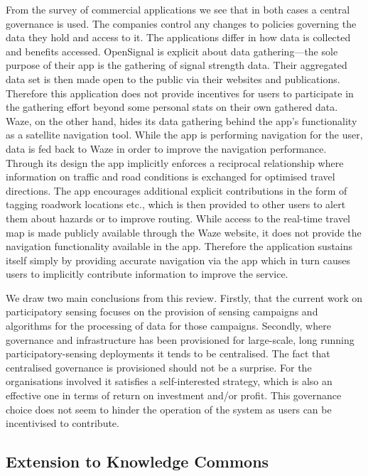 From the survey of commercial applications we see that 
in both cases a central governance is used. The companies control any changes to policies governing the data they hold and access to it. The applications differ in how data is collected and benefits accessed. 
OpenSignal is explicit about data gathering---the sole purpose of their app is the gathering of signal strength data. 
Their aggregated data set is then made open to the public via their websites and publications. Therefore this application does not provide incentives for users to participate in the gathering effort beyond some personal stats on their own gathered data. Waze, on the other hand, hides its data gathering behind the app's functionality as a satellite navigation tool. 
While the app is performing navigation for the user, data is fed back to Waze in order to improve the navigation performance. 
Through its design the app implicitly enforces a reciprocal relationship where information on traffic and road conditions is exchanged for optimised travel directions. 
The app encourages additional explicit contributions in the form of tagging roadwork locations etc., which is then provided to other users to alert them about hazards or to improve routing. 
While access to the real-time travel map is made publicly available through the Waze website, it does not provide the navigation functionality available in the app. Therefore the application sustains itself simply by providing accurate navigation via the app which in turn causes users to implicitly contribute information to improve the service.



We draw two main conclusions from this review. Firstly, that the current work on participatory sensing focuses on the provision of sensing campaigns and algorithms for the processing of data for those campaigns. Secondly, where governance and infrastructure has been provisioned for large-scale, long running participatory-sensing deployments it tends to be centralised. The fact that centralised governance is provisioned should not be a surprise. 
For the organisations involved it satisfies a self-interested strategy, which is also an effective one in terms of return on investment and/or profit. 
This governance choice does not seem to hinder the operation of the system as users can be incentivised to contribute.

\subsection{Extension to Knowledge Commons}

